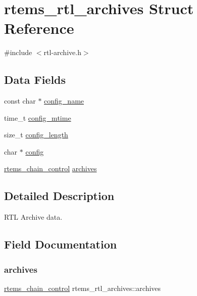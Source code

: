 \hypertarget{structrtems__rtl__archives}{}\section{rtems\+\_\+rtl\+\_\+archives Struct Reference}
\label{structrtems__rtl__archives}


{\ttfamily \#include $<$rtl-\/archive.\+h$>$}

\subsection*{Data Fields}
\begin{DoxyCompactItemize}
\item 
const char $\ast$ \mbox{\hyperlink{structrtems__rtl__archives_a6ce647b9a0a90dabb2f29cd2aae23a1d}{config\+\_\+name}}
\item 
time\+\_\+t \mbox{\hyperlink{structrtems__rtl__archives_a397d53aae05dbbdcb91bbca51293367f}{config\+\_\+mtime}}
\item 
size\+\_\+t \mbox{\hyperlink{structrtems__rtl__archives_a3238bd6c9c686d395ccaa62e9345737f}{config\+\_\+length}}
\item 
char $\ast$ \mbox{\hyperlink{structrtems__rtl__archives_a1f4ed598e54339767feb39d5267e6fc3}{config}}
\item 
\mbox{\hyperlink{unionChain__Control}{rtems\+\_\+chain\+\_\+control}} \mbox{\hyperlink{structrtems__rtl__archives_afe3c67b05ee101278b53976704404ca9}{archives}}
\end{DoxyCompactItemize}


\subsection{Detailed Description}
R\+TL Archive data. 

\subsection{Field Documentation}
\mbox{\label{structrtems__rtl__archives_afe3c67b05ee101278b53976704404ca9}} 
\subsubsection{\texorpdfstring{archives}{archives}}
{\footnotesize\ttfamily \mbox{\hyperlink{unionChain__Control}{rtems\+\_\+chain\+\_\+control}} rtems\+\_\+rtl\+\_\+archives\+::archives}

